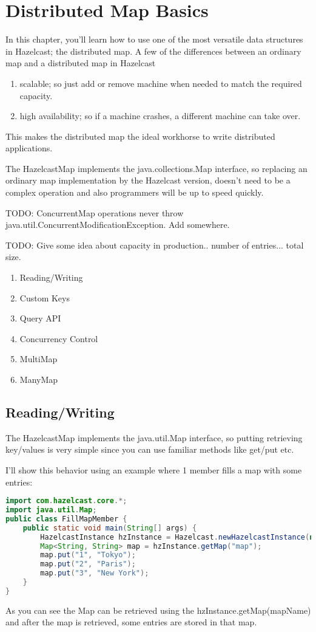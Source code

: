 \chapter{Distributed Map Basics}

In this chapter, you'll learn how to use one of the most versatile data structures in Hazelcast; the distributed map. A few of the differences between an ordinary map and a distributed map in Hazelcast
\begin{enumerate}
\item scalable; so just add or remove machine when needed to match the required capacity.
\item high availability; so if a machine crashes, a different machine can take over. 
\end{enumerate}
This makes the distributed map the ideal workhorse to write distributed applications.

The HazelcastMap implements the java.collections.Map interface, so replacing an ordinary map implementation by the Hazelcast version, doesn't need to be a complex operation and also programmers will be up to speed quickly.

TODO: ConcurrentMap operations never throw java.util.ConcurrentModificationException. Add somewhere.

TODO: Give some idea about capacity in production.. number of entries... total size.

\begin{enumerate}
\item Reading/Writing
\item Custom Keys
\item Query API
\item Concurrency Control
\item MultiMap
\item ManyMap
\end{enumerate}

\section{Reading/Writing}
The HazelcastMap implements the java.util.Map interface, so putting retrieving key/values is very simple since you can use familiar methods like get/put etc.

I'll show this behavior using an example where 1 member fills a map with some entries:
\begin{lstlisting}[language=java]
import com.hazelcast.core.*;
import java.util.Map;
public class FillMapMember {
    public static void main(String[] args) {
        HazelcastInstance hzInstance = Hazelcast.newHazelcastInstance(null);
        Map<String, String> map = hzInstance.getMap("map");
        map.put("1", "Tokyo");
        map.put("2", "Paris");
        map.put("3", "New York");
    }
}
\end{lstlisting}
As you can see the Map can be retrieved using the hzInstance.getMap(mapName) and after the map is retrieved, some entries are stored in that map. 

